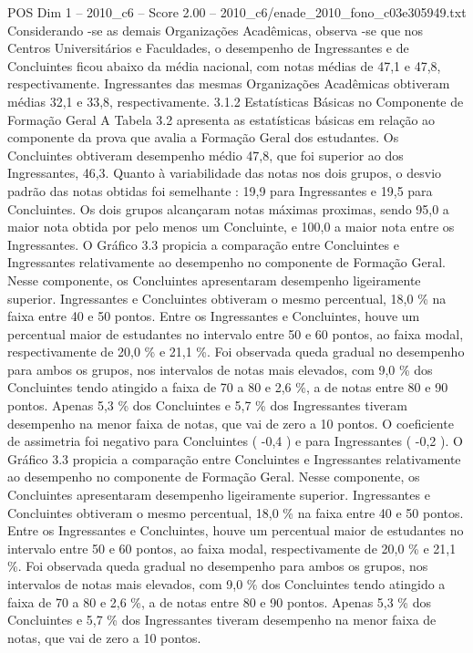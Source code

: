 \begin{textsample}{POS Dim 1 – 2010\_c6 – Score 2.00 – 2010\_c6/enade\_2010\_fono\_c03e305949.txt}
Considerando -se as demais Organizações Acadêmicas, observa -se que nos Centros Universitários e Faculdades, o desempenho de Ingressantes e de Concluintes ficou abaixo da média nacional, com notas médias de 47,1 e 47,8, respectivamente.
Ingressantes das mesmas Organizações Acadêmicas obtiveram médias 32,1 e 33,8, respectivamente. 3.1.2 Estatísticas Básicas no Componente de Formação Geral A Tabela 3.2 apresenta as estatísticas básicas em relação ao componente da prova que avalia a Formação Geral dos estudantes.
Os Concluintes obtiveram desempenho médio 47,8, que foi superior ao dos Ingressantes, 46,3.
Quanto à variabilidade das notas nos dois grupos, o desvio padrão das notas obtidas foi semelhante : 19,9 para Ingressantes e 19,5 para Concluintes.
Os dois grupos alcançaram notas máximas proximas, sendo 95,0 a maior nota obtida por pelo menos um Concluinte, e 100,0 a maior nota entre os Ingressantes.
O Gráfico 3.3 propicia a comparação entre Concluintes e Ingressantes relativamente ao desempenho no componente de Formação Geral.
Nesse componente, os Concluintes apresentaram desempenho ligeiramente superior.
Ingressantes e Concluintes obtiveram o mesmo percentual, 18,0 \% na faixa entre 40 e 50 pontos.
Entre os Ingressantes e Concluintes, houve um percentual maior de estudantes no intervalo entre 50 e 60 pontos, ao faixa modal, respectivamente de 20,0 \% e 21,1 \%.
Foi observada queda gradual no desempenho para ambos os grupos, nos intervalos de notas mais elevados, com 9,0 \% dos Concluintes tendo atingido a faixa de 70 a 80 e 2,6 \%, a de notas entre 80 e 90 pontos.
Apenas 5,3 \% dos Concluintes e 5,7 \% dos Ingressantes tiveram desempenho na menor faixa de notas, que vai de zero a 10 pontos.
O coeficiente de assimetria foi negativo para Concluintes ( -0,4 ) e para Ingressantes ( -0,2 ).
O Gráfico 3.3 propicia a comparação entre Concluintes e Ingressantes relativamente ao desempenho no componente de Formação Geral.
Nesse componente, os Concluintes apresentaram desempenho ligeiramente superior.
Ingressantes e Concluintes obtiveram o mesmo percentual, 18,0 \% na faixa entre 40 e 50 pontos.
Entre os Ingressantes e Concluintes, houve um percentual maior de estudantes no intervalo entre 50 e 60 pontos, ao faixa modal, respectivamente de 20,0 \% e 21,1 \%.
Foi observada queda gradual no desempenho para ambos os grupos, nos intervalos de notas mais elevados, com 9,0 \% dos Concluintes tendo atingido a faixa de 70 a 80 e 2,6 \%, a de notas entre 80 e 90 pontos.
Apenas 5,3 \% dos Concluintes e 5,7 \% dos Ingressantes tiveram desempenho na menor faixa de notas, que vai de zero a 10 pontos.

\end{textsample}
